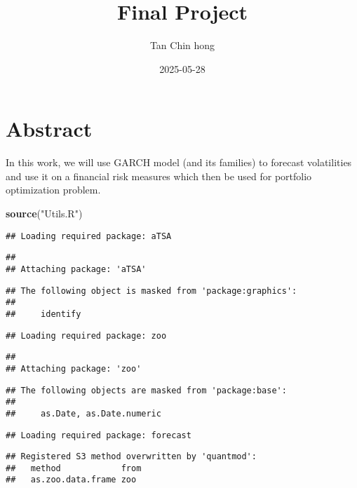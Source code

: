 \documentclass[
]{article}
\title{Final Project}
\author{Tan Chin hong}
\date{2025-05-28}
\newenvironment{Shaded}{\begin{snugshade}}{\end{snugshade}}
\newcommand{\FunctionTok}[1]{\textcolor[rgb]{0.13,0.29,0.53}{\textbf{#1}}}
\newcommand{\NormalTok}[1]{#1}
\newcommand{\StringTok}[1]{\textcolor[rgb]{0.31,0.60,0.02}{#1}}
\begin{document}
\maketitle

\section{Abstract}\label{abstract}

In this work, we will use GARCH model (and its families) to forecast
volatilities and use it on a financial risk measures which then be used
for portfolio optimization problem.

\begin{Shaded}
\begin{Highlighting}[]
\FunctionTok{source}\NormalTok{(}\StringTok{"Utils.R"}\NormalTok{)}
\end{Highlighting}
\end{Shaded}

\begin{verbatim}
## Loading required package: aTSA
\end{verbatim}

\begin{verbatim}
## 
## Attaching package: 'aTSA'
\end{verbatim}

\begin{verbatim}
## The following object is masked from 'package:graphics':
## 
##     identify
\end{verbatim}

\begin{verbatim}
## Loading required package: zoo
\end{verbatim}

\begin{verbatim}
## 
## Attaching package: 'zoo'
\end{verbatim}

\begin{verbatim}
## The following objects are masked from 'package:base':
## 
##     as.Date, as.Date.numeric
\end{verbatim}

\begin{verbatim}
## Loading required package: forecast
\end{verbatim}

\begin{verbatim}
## Registered S3 method overwritten by 'quantmod':
##   method            from
##   as.zoo.data.frame zoo
\end{verbatim}
\end{document}
